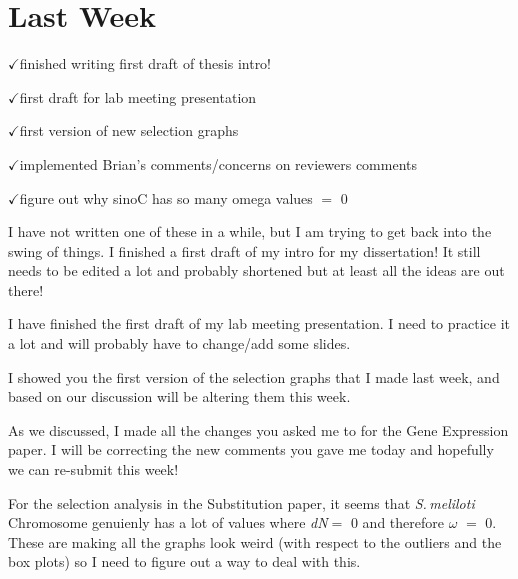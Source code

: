 \documentclass[12pt]{article}
\newcommand{\smel}{\textit{S.\,meliloti}\xspace}
\newcommand{\ecoli}{\textit{Escherichia coli}\xspace}
\newcommand{\ch}{$\checkmark$}
\newcommand{\dn}{\textit{dN}\xspace}
\begin{document}
	
\section*{Last Week}

\ch finished writing first draft of thesis intro!

\ch first draft for lab meeting presentation

\ch first version of new selection graphs

\ch implemented Brian's comments/concerns on reviewers comments

\ch figure out why sinoC has so many omega values $=$ 0


I have not written one of these in a while, but I am trying to get back into the swing of things.
I finished a first draft of my intro for my dissertation!
It still needs to be edited a lot and probably shortened but at least all the ideas are out there!

I have finished the first draft of my lab meeting presentation. I need to practice it a lot and will probably have to change/add some slides.

I showed you the first version of the selection graphs that I made last week, and based on our discussion will be altering them this week.

As we discussed, I made all the changes you asked me to for the Gene Expression paper.
I will be correcting the new comments you gave me today and hopefully we can re-submit this week!

For the selection analysis in the Substitution paper, it seems that \smel Chromosome genuienly has a lot of values where \dn $=$ 0 and therefore $\omega$ $=$ 0.
These are making all the graphs look weird (with respect to the outliers and the box plots) so I need to figure out a way to deal with this.



%
%
%
\end{document}
